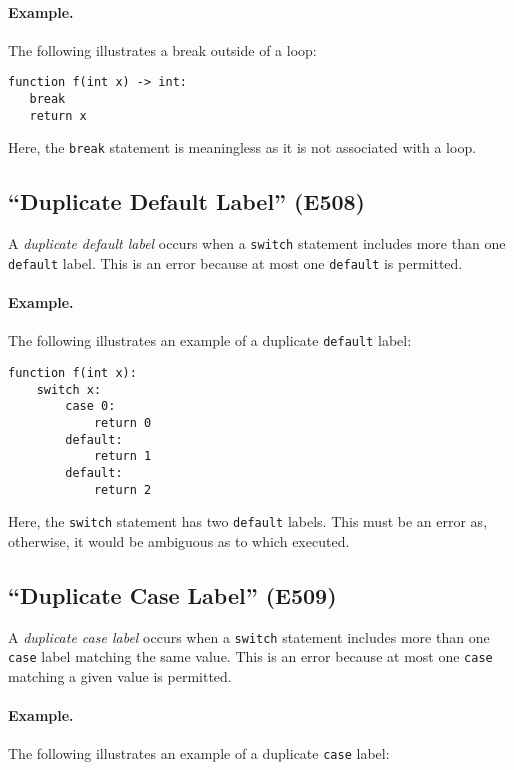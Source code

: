 \paragraph{Example.}  The following illustrates a break outside of a loop:

\begin{lstlisting}
function f(int x) -> int:
   break
   return x
\end{lstlisting}

Here, the \lstinline{break} statement is meaningless as it is not associated with a loop.

\subsection{``Duplicate Default Label'' (E508)}
A {\em duplicate default label} occurs when a \lstinline{switch} statement includes more than one \lstinline{default} label.  This is an error because at most one \lstinline{default} is permitted.

\paragraph{Example.}  The following illustrates an example of a duplicate \lstinline{default} label:

\begin{lstlisting}
function f(int x):
    switch x:
        case 0:
            return 0
        default:
            return 1
        default:
            return 2
\end{lstlisting}

Here, the \lstinline{switch} statement has two \lstinline{default} labels.  This must be an error as, otherwise, it would be ambiguous as to which executed.

\subsection{``Duplicate Case Label'' (E509)}
A {\em duplicate case label} occurs when a \lstinline{switch} statement includes more than one \lstinline{case} label matching the same value.  This is an error because at most one \lstinline{case} matching a given value is permitted.

\paragraph{Example.}  The following illustrates an example of a duplicate \lstinline{case} label:

